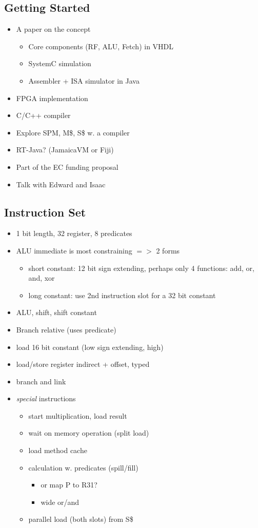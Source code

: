 \documentclass{IEEEtran}
\begin{document}
\subsection{Getting Started}

\begin{itemize}
\item A paper on the concept
\begin{itemize}
\item Core components (RF, ALU, Fetch) in VHDL
\item SystemC simulation
\item Assembler + ISA simulator in Java
\end{itemize}
\item FPGA implementation
\item C/C++ compiler
\item Explore SPM, M\$, S\$ w. a compiler
\item RT-Java? (JamaicaVM or Fiji)
\item Part of the EC funding proposal
\item Talk with Edward and Isaac
\end{itemize}

\subsection{Instruction Set}

\begin{itemize}
\item 1 bit length, 32 register, 8 predicates
\item ALU immediate is most constraining $=>$ 2 forms
\begin{itemize}
\item short constant: 12 bit sign extending, perhaps only 4 functions: add, or, and, xor
\item long constant: use 2nd instruction slot for a 32 bit constant
\end{itemize}
\item ALU, shift, shift constant
\item Branch relative (uses predicate)
\item load 16 bit constant (low sign extending, high)
\item load/store register indirect + offset, typed
\item branch and link
\item \emph{special} instructions
\begin{itemize}
\item start multiplication, load result
\item wait on memory operation (split load)
\item load method cache
\item calculation w. predicates (spill/fill)
\begin{itemize}
\item or map P to R31?
\item wide or/and
\end{itemize}
\item parallel load (both slots) from S\$
\end{itemize}
\end{itemize}
\end{document}
